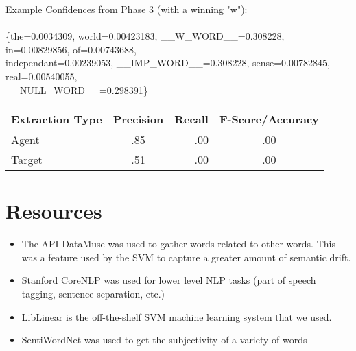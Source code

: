 \documentclass{article}
\begin{document}
\noindent Example Confidences from Phase 3 (with a winning "w"): \\\\
\{the=0.0034309, world=0.00423183, \_\_W\_WORD\_\_=0.308228, in=0.00829856, of=0.00743688,\\ independant=0.00239053, \_\_IMP\_WORD\_\_=0.308228, sense=0.00782845, real=0.00540055, \\\_\_NULL\_WORD\_\_=0.298391\}

\begin{center} 

        \begin{tabular}{ | l | c | r | c}
            \hline
            Extraction Type & Precision & Recall & F-Score/Accuracy \\ \hline
            Agent & .85 & .00 & .00\\ \hline
            Target & .51 & .00 & .00\\ \hline
        \end{tabular}
    \end{center}

    \section{Resources}

    \begin{itemize}
        \item The API DataMuse was used to gather words related to other words. This was a feature used by the SVM to capture a greater amount of semantic drift.
        \item Stanford CoreNLP was used for lower level NLP tasks (part of speech tagging, sentence separation, etc.)
        \item LibLinear is the off-the-shelf SVM machine learning system that we used.
        \item SentiWordNet was used to get the subjectivity of a variety of words
    \end{itemize}
\end{document}
